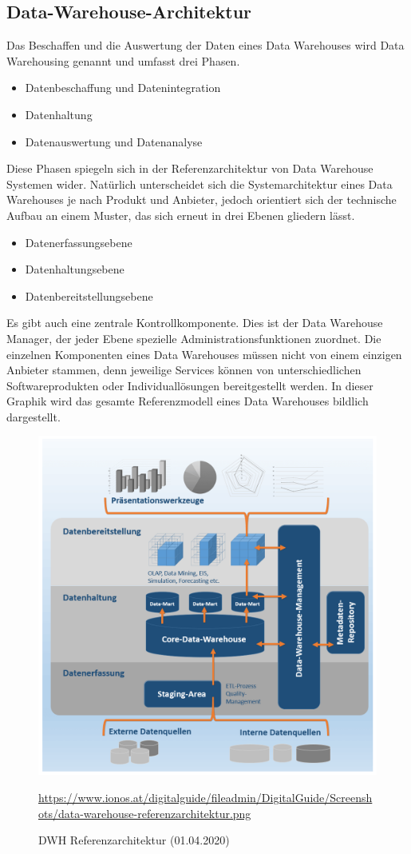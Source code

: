 \subsection{Data-Warehouse-Architektur}
Das Beschaffen und die Auswertung der Daten eines Data Warehouses wird Data Warehousing genannt und umfasst drei Phasen.
\begin{itemize}
\item Datenbeschaffung und Datenintegration
\item Datenhaltung
\item Datenauswertung und Datenanalyse
\end{itemize}
Diese Phasen spiegeln sich in der Referenzarchitektur von Data Warehouse Systemen wider. Natürlich unterscheidet sich die Systemarchitektur eines Data Warehouses je nach Produkt und Anbieter, jedoch orientiert sich der technische Aufbau an einem Muster, das sich erneut in drei Ebenen gliedern lässt.
\begin{itemize}
\item Datenerfassungsebene
\item Datenhaltungsebene
\item Datenbereitstellungsebene
\end{itemize}
Es gibt auch eine zentrale Kontrollkomponente. Dies ist der Data Warehouse Manager, der jeder Ebene spezielle Administrationsfunktionen zuordnet. Die einzelnen Komponenten eines Data Warehouses müssen nicht von einem einzigen Anbieter stammen, denn jeweilige Services können von unterschiedlichen Softwareprodukten oder Individuallösungen bereitgestellt werden.
In dieser Graphik wird das gesamte Referenzmodell eines Data Warehouses bildlich dargestellt.
\begin{figure}[H]
\centering
  \includegraphics[scale=0.4]{images/data-warehouse-referenzarchitektur.png}
  \caption[DWH Referenzarchitektur (01.04.2020)]{DWH Referenzarchitektur (01.04.2020)}
  \url{https://www.ionos.at/digitalguide/fileadmin/DigitalGuide/Screenshots/data-warehouse-referenzarchitektur.png}
  \label{fig:DWH-RA}
\end{figure}
\newpage
